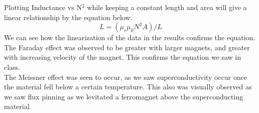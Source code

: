 \documentclass{article}
\begin{document}
Plotting Inductance vs N$^2$ while keeping a constant length and area will give a linear relationship by the equation below.
$$L = (\mu_r\mu_0N^2A)/L$$
We can see how the linearization of the data in the results confirms the equation.\\

The Faraday effect was observed to be greater with larger magnets, and greater with increasing velocity of the magnet. This confirms the equation we saw in class.\\

The Meissner effect was seen to occur, as we saw superconductivity occur once the material fell below a certain temperature. This also was visually observed as we saw flux pinning as we levitated a ferromagnet above the superconducting material.
\end{document}
